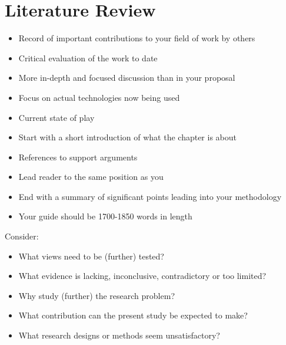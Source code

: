 \section{Literature Review}
\begin{itemize}
\item Record of important contributions to your field of work by others
\item Critical evaluation of the work to date
\item More in-depth and focused discussion than in your proposal
\item Focus on actual technologies now being used
\item Current state of play
\item Start with a short introduction of what the chapter is about
\item References to support arguments
\item Lead reader to the same position as you
\item End with a summary of significant points leading into your methodology
\item Your guide should be 1700-1850 words in length
\end{itemize}

Consider:
\begin{itemize}
    \item What views need to be (further) tested?
\item What evidence is lacking, inconclusive, contradictory or too limited?
\item Why study (further) the research problem?
\item What contribution can the present study be expected to make?
\item What research designs or methods seem unsatisfactory?
\end{itemize}